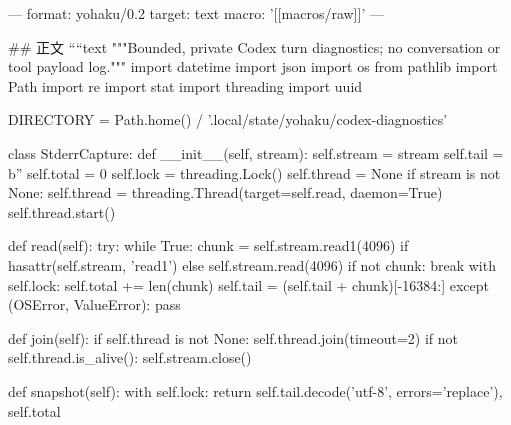 ---
format: yohaku/0.2
target: text
macro: '[[macros/raw]]'
---

## 正文
````text
"""Bounded, private Codex turn diagnostics; no conversation or tool payload log."""
import datetime
import json
import os
from pathlib import Path
import re
import stat
import threading
import uuid

DIRECTORY = Path.home() / '.local/state/yohaku/codex-diagnostics'


class StderrCapture:
    def __init__(self, stream):
        self.stream = stream
        self.tail = b''
        self.total = 0
        self.lock = threading.Lock()
        self.thread = None
        if stream is not None:
            self.thread = threading.Thread(target=self.read, daemon=True)
            self.thread.start()

    def read(self):
        try:
            while True:
                chunk = self.stream.read1(4096) if hasattr(self.stream, 'read1') else self.stream.read(4096)
                if not chunk:
                    break
                with self.lock:
                    self.total += len(chunk)
                    self.tail = (self.tail + chunk)[-16384:]
        except (OSError, ValueError):
            pass

    def join(self):
        if self.thread is not None:
            self.thread.join(timeout=2)
            if not self.thread.is_alive():
                self.stream.close()

    def snapshot(self):
        with self.lock:
            return self.tail.decode('utf-8', errors='replace'), self.total



